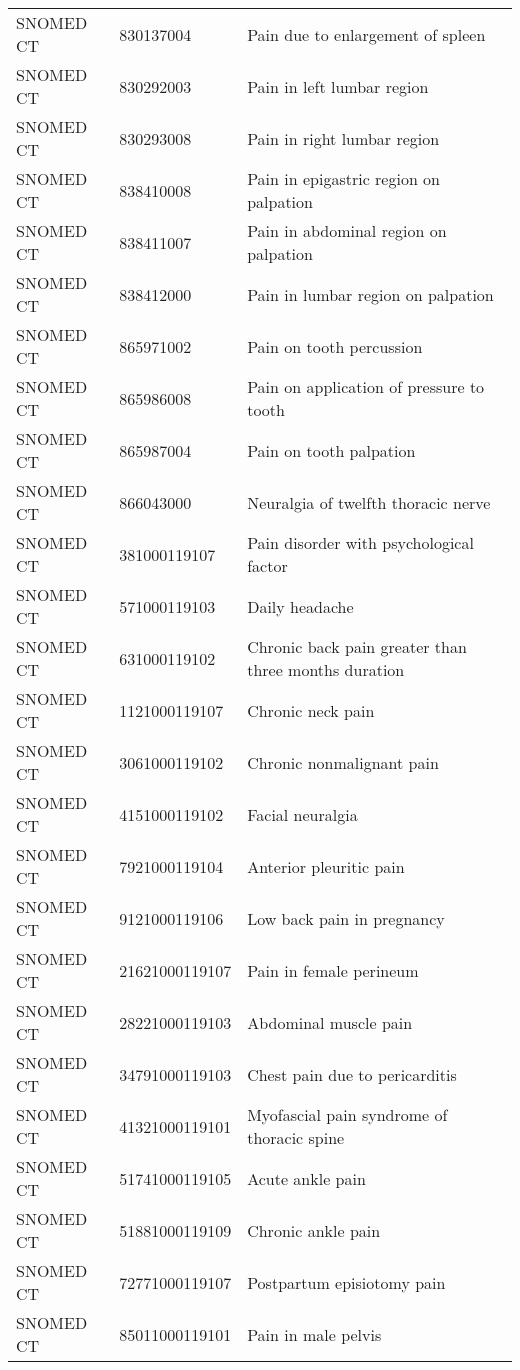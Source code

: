 \begin{longtable}{p{}p{}p{}}
  SNOMED CT & 830137004 & Pain due to enlargement of spleen \\ 
  SNOMED CT & 830292003 & Pain in left lumbar region \\ 
  SNOMED CT & 830293008 & Pain in right lumbar region \\ 
  SNOMED CT & 838410008 & Pain in epigastric region on palpation \\ 
  SNOMED CT & 838411007 & Pain in abdominal region on palpation \\ 
  SNOMED CT & 838412000 & Pain in lumbar region on palpation \\ 
  SNOMED CT & 865971002 & Pain on tooth percussion \\ 
  SNOMED CT & 865986008 & Pain on application of pressure to tooth \\ 
  SNOMED CT & 865987004 & Pain on tooth palpation \\ 
  SNOMED CT & 866043000 & Neuralgia of twelfth thoracic nerve \\ 
  SNOMED CT & 381000119107 & Pain disorder with psychological factor \\ 
  SNOMED CT & 571000119103 & Daily headache \\ 
  SNOMED CT & 631000119102 & Chronic back pain greater than three months duration \\ 
  SNOMED CT & 1121000119107 & Chronic neck pain \\ 
  SNOMED CT & 3061000119102 & Chronic nonmalignant pain \\ 
  SNOMED CT & 4151000119102 & Facial neuralgia \\ 
  SNOMED CT & 7921000119104 & Anterior pleuritic pain \\ 
  SNOMED CT & 9121000119106 & Low back pain in pregnancy \\ 
  SNOMED CT & 21621000119107 & Pain in female perineum \\ 
  SNOMED CT & 28221000119103 & Abdominal muscle pain \\ 
  SNOMED CT & 34791000119103 & Chest pain due to pericarditis \\ 
  SNOMED CT & 41321000119101 & Myofascial pain syndrome of thoracic spine \\ 
  SNOMED CT & 51741000119105 & Acute ankle pain \\ 
  SNOMED CT & 51881000119109 & Chronic ankle pain \\ 
  SNOMED CT & 72771000119107 & Postpartum episiotomy pain \\ 
  SNOMED CT & 85011000119101 & Pain in male pelvis \\ 

\end{longtable}
